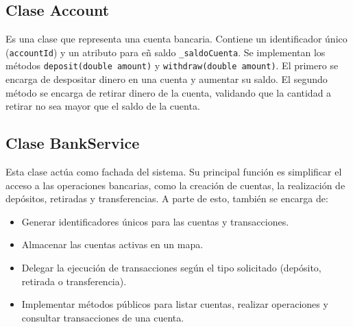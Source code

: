 \documentclass[12pt]{article}
\begin{document}
\subsection{Clase Account}

Es una clase que representa una cuenta bancaria. Contiene un identificador único (\texttt{accountId}) y un atributo para eñ saldo \texttt{\_saldoCuenta}. Se implementan los métodos \texttt{deposit(double amount)} y \texttt{withdraw(double amount)}. El primero se encarga de despositar dinero en una cuenta y aumentar su saldo. El segundo método se encarga de retirar dinero de la cuenta, validando que la cantidad a retirar no sea mayor que el saldo de la cuenta.


\subsection{Clase BankService}
Esta clase actúa como fachada del sistema. Su principal función es simplificar el acceso a las operaciones bancarias, como la creación de cuentas, la realización de depósitos, retiradas y transferencias. A parte de esto, también se encarga de:
\begin{itemize}
    \item Generar identificadores únicos para las cuentas y transacciones.
    \item Almacenar las cuentas activas en un mapa.
    \item Delegar la ejecución de transacciones según el tipo solicitado (depósito, retirada o transferencia).
    \item Implementar métodos públicos para listar cuentas, realizar operaciones y consultar transacciones de una cuenta.
\end{itemize}
\end{document}
